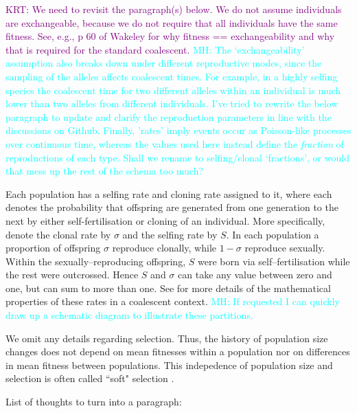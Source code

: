 \documentclass[11pt]{article}
\newcommand{\krtcomment}[1]{{\textcolor{purple}{KRT: #1}}}
\newcommand{\mhcomment}[1]{{\textcolor{cyan}{MH: #1}}}
\begin{document}
\krtcomment{We need to revisit the paragraph(s) below.  We do not assume individuals are exchangeable, because we do not
	require that all individuals have the same fitness. See, e.g., p 60 of Wakeley for why fitness == exchangeability
	and why that is required for the standard coalescent.}
\mhcomment{The `exchangeability' assumption also breaks down under 
	different reproductive modes, since the sampling of the alleles affects coalescent times. 
	For example, in a highly selfing species the coalescent time for two different alleles 
	within an individual is much lower than two alleles from different individuals. I've tried 
	to rewrite the below paragraph to update and clarify the reproduction parameters in 
	line with the discussions on Github. Finally, 'rates' imply events occur as Poisson-like 
	processes over continuous time, whereas the values used here instead define the 
	\emph{fraction} of reproductions of each type. Shall we rename to selfing/clonal `fractions',
	 or would that mess up the rest of the schema too much?}

Each population has a selfing rate and cloning rate assigned to it, where each denotes 
the probability that offspring are generated from one generation to the next by either 
self-fertilisation or cloning of an individual. More specifically, denote the clonal rate by 
$\sigma$ and the selfing rate by $S$. In each population a proportion of offspring 
$\sigma$ reproduce clonally, while $1-\sigma$ reproduce sexually. Within the 
sexually--reproducing offspring, $S$ were born via self--fertilisation while the rest were 
outcrossed. Hence $S$ and $\sigma$ can take any value between zero and one, but 
can sum to more than one. See \citet{hartfield2016facsexcoal} for more details of the 
mathematical properties of these rates in a coalescent context. \mhcomment{If requested 
I can quickly draw up a schematic diagram to illustrate these partitions.} 

We omit any details regarding selection.
Thus, the history of population size changes does not depend on mean fitnesses within
a population nor on differences in mean fitness between populations.
This indepedence of population size and
selection is often called ``soft" selection \citep{christiansen1975hard}.

List of thoughts to turn into a paragraph:
\end{document}
